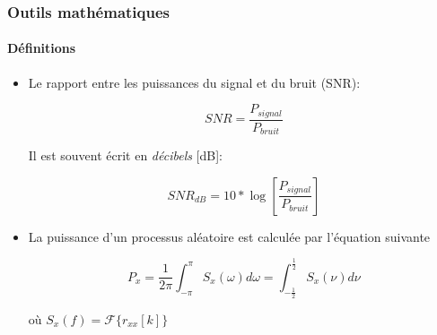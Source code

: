 \documentclass[10pt]{beamer}
\begin{document}
\begin{frame}

\frametitle{Outils mathématiques}
\framesubtitle{Définitions}

\begin{itemize}
  
  \item Le rapport entre les puissances du signal et du bruit (SNR):
  
  \begin{equation}
SNR = \frac{P_{signal}}{P_{bruit}}
\end{equation}

Il est souvent écrit en \textit{décibels} [dB]:

\begin{equation}
\label{eq:snr}
SNR_{dB} = 10* \log \left[ \frac{P_{signal}}{P_{bruit}} \right]
\end{equation}

\item La puissance d'un processus aléatoire est calculée par l'équation suivante

\begin{equation}
P_x = \frac{1}{2\pi} \int_{-\pi}^{\pi}  S_x (\omega) d\omega = \int_{-\frac{1}{2}}^{\frac{1}{2}}  S_x (\nu) d\nu
\end{equation}

où \(S_x(f) = \mathcal{F} \{r_{xx}[k]\}\)

\end{itemize}
\end{frame}


\end{document}
